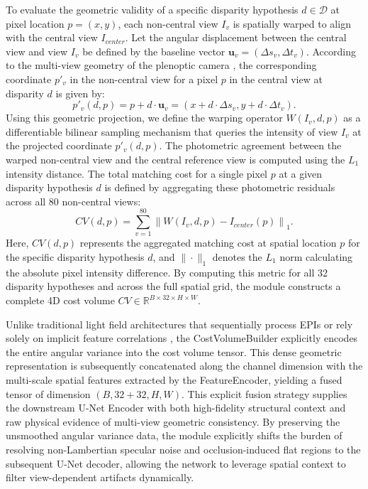 \documentclass[lettersize,journal]{IEEEtran}
\begin{document}
To evaluate the geometric validity of a specific disparity hypothesis $d \in \mathcal{D}$ at pixel location $p = (x, y)$, each non-central view $I_v$ is spatially warped to align with the central view $I_{center}$. Let the angular displacement between the central view and view $I_v$ be defined by the baseline vector $\mathbf{u}_v = (\Delta s_v, \Delta t_v)$. According to the multi-view geometry of the plenoptic camera \cite{ng2005}, the corresponding coordinate $p'_v$ in the non-central view for a pixel $p$ in the central view at disparity $d$ is given by:
\begin{equation}
p'_v(d, p) = p + d \cdot \mathbf{u}_v = (x + d \cdot \Delta s_v, y + d \cdot \Delta t_v).
\end{equation}
Using this geometric projection, we define the warping operator $W(I_v, d, p)$ as a differentiable bilinear sampling mechanism that queries the intensity of view $I_v$ at the projected coordinate $p'_v(d, p)$. The photometric agreement between the warped non-central view and the central reference view is computed using the $L_1$ intensity distance. The total matching cost for a single pixel $p$ at a given disparity hypothesis $d$ is defined by aggregating these photometric residuals across all 80 non-central views:
\begin{equation}
CV(d, p) = \sum_{v=1}^{80} \left\| W(I_v, d, p) - I_{center}(p) \right\|_1.
\end{equation}
Here, $CV(d, p)$ represents the aggregated matching cost at spatial location $p$ for the specific disparity hypothesis $d$, and $\|\cdot\|_1$ denotes the $L_1$ norm calculating the absolute pixel intensity difference. By computing this metric for all 32 disparity hypotheses and across the full spatial grid, the module constructs a complete 4D cost volume $CV \in \mathbb{R}^{B \times 32 \times H \times W}$. 

Unlike traditional light field architectures that sequentially process EPIs or rely solely on implicit feature correlations \cite{wanner2014, wang2023}, the CostVolumeBuilder explicitly encodes the entire angular variance into the cost volume tensor. This dense geometric representation is subsequently concatenated along the channel dimension with the multi-scale spatial features extracted by the FeatureEncoder, yielding a fused tensor of dimension $(B, 32+32, H, W)$. This explicit fusion strategy supplies the downstream U-Net Encoder with both high-fidelity structural context and raw physical evidence of multi-view geometric consistency. By preserving the unsmoothed angular variance data, the module explicitly shifts the burden of resolving non-Lambertian specular noise and occlusion-induced flat regions to the subsequent U-Net decoder, allowing the network to leverage spatial context to filter view-dependent artifacts dynamically.
\end{document}
